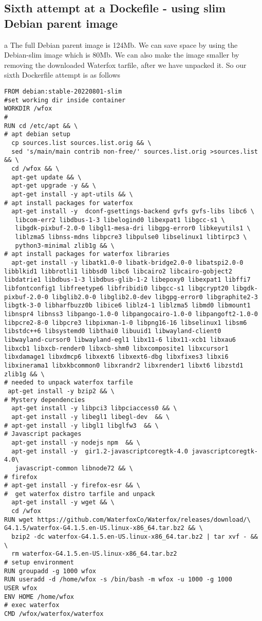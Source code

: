 \documentclass{article}  %
\begin{document}
\subsection{Sixth attempt at a Dockefile - using slim Debian parent image}
a The full Debian parent image is 124Mb. We can save space by using the Debian-slim image which is 80Mb.  We can also make the image smaller by removing the downloaded Waterfox tarfile, after we have unpacked it.
So our sixth Dockerfile attempt is as follows
\begin{verbatim}
FROM debian:stable-20220801-slim
#set working dir inside container
WORKDIR /wfox
#
RUN cd /etc/apt && \
# apt debian setup
  cp sources.list sources.list.orig && \
  sed 's/main/main contrib non-free/' sources.list.orig >sources.list && \
  cd /wfox && \
  apt-get update && \
  apt-get upgrade -y && \
  apt-get install -y apt-utils && \
# apt install packages for waterfox
  apt-get install -y  dconf-gsettings-backend gvfs gvfs-libs libc6 \
   libcom-err2 libdbus-1-3 libelogind0 libexpat1 libgcc-s1 \
   libgdk-pixbuf-2.0-0 libgl1-mesa-dri libgpg-error0 libkeyutils1 \
   liblzma5 libnss-mdns libpcre3 libpulse0 libselinux1 libtirpc3 \
   python3-minimal zlib1g && \
# apt install packages for waterfox libraries
  apt-get install -y libatk1.0-0 libatk-bridge2.0-0 libatspi2.0-0 libblkid1 libbrotli1 libbsd0 libc6 libcairo2 libcairo-gobject2 libdatrie1 libdbus-1-3 libdbus-glib-1-2 libepoxy0 libexpat1 libffi7 libfontconfig1 libfreetype6 libfribidi0 libgcc-s1 libgcrypt20 libgdk-pixbuf-2.0-0 libglib2.0-0 libglib2.0-dev libgpg-error0 libgraphite2-3 libgtk-3-0 libharfbuzz0b libice6 liblz4-1 liblzma5 libmd0 libmount1 libnspr4 libnss3 libpango-1.0-0 libpangocairo-1.0-0 libpangoft2-1.0-0 libpcre2-8-0 libpcre3 libpixman-1-0 libpng16-16 libselinux1 libsm6 libstdc++6 libsystemd0 libthai0 libuuid1 libwayland-client0 libwayland-cursor0 libwayland-egl1 libx11-6 libx11-xcb1 libxau6 libxcb1 libxcb-render0 libxcb-shm0 libxcomposite1 libxcursor1 libxdamage1 libxdmcp6 libxext6 libxext6-dbg libxfixes3 libxi6 libxinerama1 libxkbcommon0 libxrandr2 libxrender1 libxt6 libzstd1 zlib1g && \
# needed to unpack waterfox tarfile
 apt-get install -y bzip2 && \
# Mystery dependencies
  apt-get install -y libpci3 libpciaccess0 && \
  apt-get install -y libegl1 libegl-dev  && \
# apt-get install -y libgl1 libglfw3  && \
# Javascript packages
  apt-get install -y nodejs npm  && \
  apt-get install -y  gir1.2-javascriptcoregtk-4.0 javascriptcoregtk-4.0\
   javascript-common libnode72 && \
# firefox
# apt-get install -y firefox-esr && \
#  get waterfox distro tarfile and unpack
  apt-get install -y wget && \
  cd /wfox 
RUN wget https://github.com/WaterfoxCo/Waterfox/releases/download/\
G4.1.5/waterfox-G4.1.5.en-US.linux-x86_64.tar.bz2 && \
  bzip2 -dc waterfox-G4.1.5.en-US.linux-x86_64.tar.bz2 | tar xvf - && \
  rm waterfox-G4.1.5.en-US.linux-x86_64.tar.bz2
# setup environment
RUN groupadd -g 1000 wfox
RUN useradd -d /home/wfox -s /bin/bash -m wfox -u 1000 -g 1000
USER wfox
ENV HOME /home/wfox
# exec waterfox
CMD /wfox/waterfox/waterfox
\end{verbatim}
\end{document}
